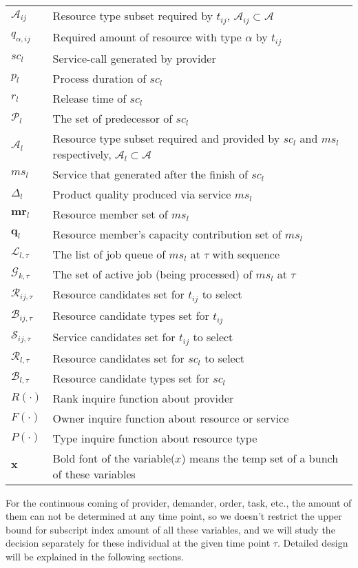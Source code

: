\begin{table}[htbp]
\begin{tabularx}{\textwidth}{|lX|}
	$\mathcal{A}_{ij}$ & Resource type subset required by $t_{ij}$, $\mathcal{A}_{ij}\subset\mathcal{A}$\\
	$q_{\alpha,ij}$ & Required amount of resource with type $\alpha$ by $t_{ij}$\\
	$sc_l$ & Service-call generated by provider\\
	$p_l$ & Process duration of $sc_l$\\
	$r_l$ & Release time of $sc_l$\\
	$\mathcal{P}_{l}$ & The set of predecessor of $sc_{l}$\\
	$\mathcal{A}_l$ & Resource type subset required and provided by $sc_l$ and $ms_l$ respectively, $\mathcal{A}_l\subset\mathcal{A}$\\
	$ms_l$ & Service that generated after the finish of $sc_l$\\
	$\Delta_l$ & Product quality produced via service $ms_l$\\
	$\bm{mr}_l$ & Resource member set of $ms_l$\\
	$\bm{q}_l$ & Resource member's capacity contribution set of $ms_l$\\
	$\mathcal{L}_{l,\tau}$ & The list of job queue of $ms_l$ at $\tau$ with sequence\\
	$\mathcal{G}_{k,\tau}$ & The set of active job (being processed) of $ms_l$ at $\tau$ \\
	$\mathcal{R}_{ij,\tau}$ & Resource candidates set for $t_{ij}$ to select\\
	$\mathcal{B}_{ij,\tau}$ & Resource candidate types set for $t_{ij}$\\
	$\mathcal{S}_{ij,\tau}$ & Service candidates set for $t_{ij}$ to select\\
	$\mathcal{R}_{l,\tau}$ & Resource candidates set for $sc_l$ to select\\
	$\mathcal{B}_{l,\tau}$ & Resource candidate types set for $sc_l$\\
	$R(\cdot)$ & Rank inquire function about provider\\
	$F(\cdot)$ & Owner inquire function about resource or service\\
	$P(\cdot)$ & Type inquire function about resource type\\
	$\bm{x}$ & Bold font of the variable($x$) means the temp set of a bunch of these variables\\
    \hline
\end{tabularx}
\end{table}

For the continuous coming of provider, demander, order, task, etc., the amount of them can not be determined at any time point, so we doesn't restrict the upper bound for subscript index amount of all these variables, and we will study the decision separately for these individual at the given time point $\tau$. Detailed design will be explained in the following sections.

